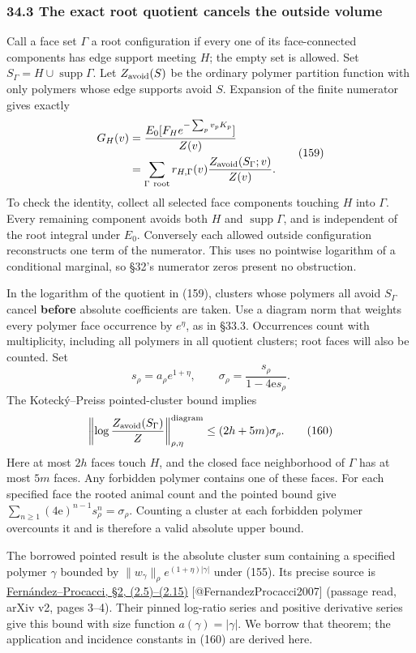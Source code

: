 \documentclass[11pt,a4paper]{article}
\begin{document}
\hypertarget{the-exact-root-quotient-cancels-the-outside-volume}{%
\subsubsection{34.3 The exact root quotient cancels the outside
volume}\label{the-exact-root-quotient-cancels-the-outside-volume}}

Call a face set \(\Gamma\) a root configuration if every one of its
face-connected components has edge support meeting \(H\); the empty set
is allowed. Set \(S_\Gamma=H\cup\operatorname{supp}\Gamma\). Let
\(Z_{\rm avoid}(S)\) be the ordinary polymer partition function with
only polymers whose edge supports avoid \(S\). Expansion of the finite
numerator gives exactly \[\begin{aligned}
G_H(v)&=\frac{E_0[F_H e^{-\sum_pv_pK_p}]}{Z(v)}\\
 &=\sum_{\Gamma\ {\rm root}}
       r_{H,\Gamma}(v)
       \frac{Z_{\rm avoid}(S_\Gamma;v)}{Z(v)}.
\end{aligned}\tag{159}\] To check the identity, collect all selected
face components touching \(H\) into \(\Gamma\). Every remaining
component avoids both \(H\) and \(\operatorname{supp}\Gamma\), and is
independent of the root integral under \(E_0\). Conversely each allowed
outside configuration reconstructs one term of the numerator. This uses
no pointwise logarithm of a conditional marginal, so §32's numerator
zeros present no obstruction.

In the logarithm of the quotient in (159), clusters whose polymers all
avoid \(S_\Gamma\) cancel \textbf{before} absolute coefficients are
taken. Use a diagram norm that weights every polymer face occurrence by
\(e^\eta\), as in §33.3. Occurrences count with multiplicity, including
all polymers in all quotient clusters; root faces will also be counted.
Set \[s_\rho=a_\rho e^{1+\eta},\qquad
\sigma_\rho=\frac{s_\rho}{1-4\mathrm e s_\rho}.\] The Kotecký--Preiss
pointed-cluster bound implies
\[\left\|\log\frac{Z_{\rm avoid}(S_\Gamma)}Z
 \right\|_{\rho,\eta}^{\rm diagram}
 \le(2h+5m)\sigma_\rho.\tag{160}\] Here at most \(2h\) faces touch
\(H\), and the closed face neighborhood of \(\Gamma\) has at most \(5m\)
faces. Any forbidden polymer contains one of these faces. For each
specified face the rooted animal count and the pointed bound give
\(\sum_{n\ge1}(4\mathrm e)^{n-1}s_\rho^n=\sigma_\rho\). Counting a
cluster at each forbidden polymer overcounts it and is therefore a valid
absolute upper bound.

The borrowed pointed result is the absolute cluster sum containing a
specified polymer \(\gamma\) bounded by
\(\|w_\gamma\|_\rho e^{(1+\eta)|\gamma|}\) under (155). Its precise
source is
\href{https://arxiv.org/pdf/math-ph/0605041}{Fernández--Procacci, §2,
(2.5)--(2.15)} {[}@FernandezProcacci2007{]} (passage read, arXiv v2,
pages 3--4). Their pinned log-ratio series and positive derivative
series give this bound with size function \(a(\gamma)=|\gamma|\). We
borrow that theorem; the application and incidence constants in (160)
are derived here.
\end{document}
